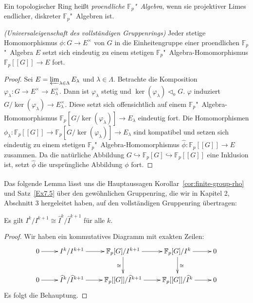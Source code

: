\documentclass[11pt,a4paper,openany]{memoir}
\begin{document}
\begin{definition}
Ein topologischer Ring heißt \textit{proendliche $\mathbb{F}_p$"~Algebra}, wenn sie projektiver Limes endlicher, diskreter $\mathbb{F}_p$"~Algebren ist.
\end{definition}

\begin{proposition}\textit{(Universaleigenschaft des vollständigen Gruppenrings)}
Jeder stetige Homomorphismus $\phi:G\to E^\times$ von $G$ in die Einheitengruppe einer proendlichen $\mathbb{F}_p$"~Algebra $E$ setzt sich eindeutig zu einem stetigen $\mathbb{F}_p$"~Algebra-Homomorphismus $\mathbb{F}_p[[G]]\to E$ fort.
\end{proposition}

\begin{proof}
Sei $E=\varprojlim_{\lambda\in\Lambda} E_\lambda$ und $\lambda\in\Lambda$. Betrachte die Komposition $\varphi_\lambda:G\to E^\times\to E_\lambda^\times$. Dann ist $\varphi_\lambda$ stetig und $\ker(\varphi_\lambda)\lhd_\text{o}G$. $\varphi$ induziert $G/\ker(\varphi_\lambda)\to E_\lambda^\times$. Diese setzt sich offensichtlich auf einem $\mathbb{F}_p$"~Algebra-Homomorphismus $\mathbb{F}_p[G/\ker(\varphi_\lambda)]\to E_\lambda$ eindeutig fort. Die Homomorphismen $\phi_\lambda:\mathbb{F}_p[[G]]\to \mathbb{F}_p[G/\ker(\varphi_\lambda)]\to E_\lambda$ sind kompatibel und setzen sich eindeutig zu einem stetigen $\mathbb{F}_p$"~Algebra-Homomorphismus $\widehat{\phi}:\mathbb{F}_p[[G]]\to E$ zusammen. Da die natürliche Abbildung $G\hookrightarrow \mathbb{F}_p[G]\hookrightarrow\mathbb{F}_p[[G]]$ eine Inklusion ist, setzt $\widehat{\phi}$ die ursprüngliche Abbildung $\phi$ fort.
\end{proof}

\paragraph{} Das folgende Lemma lässt uns die Hauptaussagen Korollar~\ref{cor:finite-group-rho} und Satz~\ref{Ex7.5} über den gewöhnlichen Gruppenring, die wir in Kapitel 2, Abschnitt 3 hergeleitet haben, auf den voll\-stän\-di\-gen Gruppenring übertragen:

\begin{lemma}\label{lemma:nuisance}
Es gilt $I^k/I^{k+1}\cong \widehat{I}^k/\widehat{I}^{k+1}$ für alle $k$.
\end{lemma}

\begin{proof}
Wir haben ein kommutatives Diagramm mit exakten Zeilen:
\[\xymatrix{
0\ar[r] & I^k/I^{k+1} \ar[r]& \mathbb{F}_p[G]/I^{k+1} \ar[r]\ar[d]_\cong& \mathbb{F}_p[G]/I^k\ar[r]\ar[d]^\cong & 0\\
0 \ar[r] & \widehat{I}^k/\widehat{I}^{k+1} \ar[r] & \mathbb{F}_p[[G]]/\widehat{I}^{k+1} \ar[r] &\mathbb{F}_p[[G]]/\widehat{I}^k \ar[r] & 0
} \]
Es folgt die Behauptung.
\end{proof}
\end{document}
